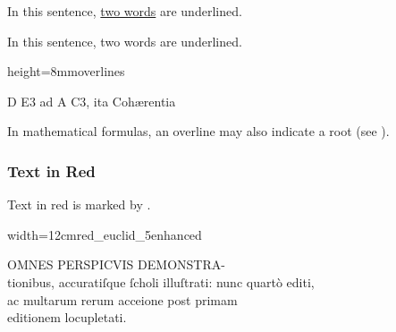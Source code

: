 
\vspace{3mm}
\begin{example}[ 1: \, underlines]

\vspace{-4mm}
In this sentence, \underline{two words} are underlined.

\vspace{-3mm}
\begin{typeLatin}
In this sentence, two words are underlined.
\end{typeLatin}
\end{example}

\begin{sampleImageSmall}[ 2: \, overlines]{height=8mm}{overlines}

\begin{typeLatin}
D E3 ad A C\lwr{}3, ita Cohærentia
\end{typeLatin}
\end{sampleImageSmall}

\begin{crossref}
In mathematical formulas, an overline may also indicate a root (see ).
\end{crossref}


\subsubsection{Text in Red}
\label{section text in red}

\begin{mainruleLessImportant}
Text in red is marked by .
\end{mainruleLessImportant}

\vspace{3mm}
\begin{sampleImageSmall}{width=12cm}{red_euclid_5enhanced}

\begin{typeLatin}
OMNES PERSPICVIS DEMONSTRA-  \\
tionibus, accuratiſque ſcholi illuſtrati: nunc quartò editi,  \\
ac multarum rerum acceione post primam  \\
editionem locupletati.
\end{typeLatin}
\end{sampleImageSmall}

